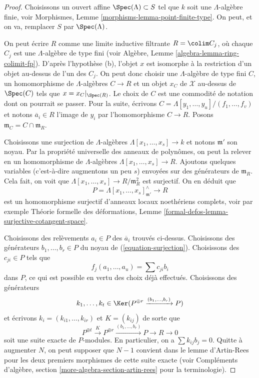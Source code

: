 \begin{proof}
Choisissons un ouvert affine $\Spec(\Lambda) \subset S$ tel que $k$ soit une
$\Lambda$-algèbre finie, voir
Morphismes, Lemme \ref{morphisms-lemma-point-finite-type}.
On peut, et on va, remplacer $S$ par $\Spec(\Lambda)$.

\medskip\noindent
On peut écrire $R$ comme une limite inductive filtrante $R = \colim C_j$, où chaque
$C_j$ est une $\Lambda$-algèbre de type fini (voir
Algèbre, Lemme \ref{algebra-lemma-ring-colimit-fp}).
D'après l'hypothèse (b), l'objet $x$ est isomorphe à la restriction d'un
objet au-dessus de l'un des $C_j$. On peut donc choisir une
$\Lambda$-algèbre de type fini $C$, un homomorphisme de $\Lambda$-algèbres $C \to R$ et un objet
$x_C$ de $\mathcal{X}$ au-dessus de $\Spec(C)$ tels que $x = x_C|_{\Spec(R)}$.
Le choix de $C$ est une commodité de notation dont on pourrait se passer.
Pour la suite, écrivons $C = \Lambda[y_1, \ldots, y_u]/(f_1, \ldots, f_v)$
et notons $\overline{a}_i \in R$ l'image de $y_i$ par
l'homomorphisme $C \to R$. Posons $\mathfrak m_C = C \cap \mathfrak m_R$.

\medskip\noindent
Choisissons une surjection de $\Lambda$-algèbres $\Lambda[x_1, \ldots, x_s] \to k$
et notons $\mathfrak m'$ son noyau.
Par la propriété universelle des anneaux de polynômes, on peut la relever
en un homomorphisme de $\Lambda$-algèbres $\Lambda[x_1, \ldots, x_s] \to R$.
Ajoutons quelques variables (c'est-à-dire augmentons un peu $s$) envoyées sur des générateurs
de $\mathfrak m_R$. Cela fait, on voit que
$\Lambda[x_1, \ldots, x_s] \to R/\mathfrak m_R^2$ est surjectif.
On en déduit que
\begin{equation}
\label{equation-surjection}
P = \Lambda[x_1, \ldots, x_s]_{\mathfrak m'}^\wedge \longrightarrow R
\end{equation}
est un homomorphisme surjectif d'anneaux locaux noethériens complets, voir par exemple
Théorie formelle des déformations, Lemme
\ref{formal-defos-lemma-surjective-cotangent-space}.

\medskip\noindent
Choisissons des relèvements $a_i \in P$ des $\overline{a}_i$ trouvés ci-dessus.
Choisissons des générateurs $b_1, \ldots, b_r \in P$ du noyau de
(\ref{equation-surjection}).
Choisissons des $c_{ji} \in P$ tels que
$$
f_j(a_1, \ldots, a_u) = \sum c_{ji} b_i
$$
dans $P$, ce qui est possible en vertu des choix déjà effectués. Choisissons des générateurs
$$
k_1, \ldots, k_t \in
\Ker(P^{\oplus r} \xrightarrow{(b_1, \ldots, b_r)} P)
$$
et écrivons $k_i = (k_{i1}, \ldots, k_{ir})$ et $K = (k_{ij})$
de sorte que
$$
P^{\oplus t} \xrightarrow{K}
P^{\oplus r} \xrightarrow{(b_1, \ldots, b_r)}
P \to R \to 0
$$
soit une suite exacte de $P$-modules. En particulier, on a
$\sum k_{ij} b_j = 0$. Quitte à augmenter $N$, on peut
supposer que $N - 1$ convient dans le lemme d'Artin-Rees pour les deux premiers morphismes de cette
suite exacte (voir Compléments d'algèbre, section
\ref{more-algebra-section-artin-rees} pour la terminologie).


\end{proof}
